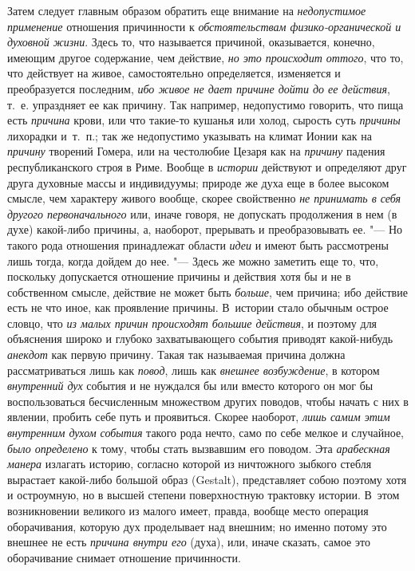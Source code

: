 Затем следует главным образом обратить еще внимание на
{\em недопустимое применение} отношения причинности к
{\em обстоятельствам физико-органической и духовной
жизни}. Здесь то, что называется причиной, оказывается, конечно, имеющим
другое содержание, чем действие, {\em но это происходит
оттого}, что то, что действует на живое, самостоятельно определяется,
изменяется и преобразуется последним, {\em ибо живое не
дает причине дойти до ее действия}, т.~е. упраздняет ее как причину. Так
например, недопустимо говорить, что пища есть
{\em причина} крови, или что такие-то кушанья или
холод, сырость суть {\em причины} лихорадки и~т.~п.;
так же недопустимо указывать на климат Ионии как на
{\em причину} творений Гомера, или на честолюбие Цезаря
как на {\em причину} падения республиканского строя в
Риме. Вообще в {\em истории} действуют и определяют
друг друга духовные массы и индивидуумы; природе же духа еще в более
высоком смысле, чем характеру живого вообще, скорее свойственно
{\em не принимать в себя другого первоначального} или,
иначе говоря, не допускать продолжения в нем (в духе) какой-либо причины,
а, наоборот, прерывать и преобразовывать ее. "--- Но такого рода отношения
принадлежат области {\em идеи} и имеют быть рассмотрены
лишь тогда, когда дойдем до нее. "--- Здесь же можно заметить еще то, что,
поскольку допускается отношение причины и действия хотя бы и не в
собственном смысле, действие не может быть
{\em больше}, чем причина; ибо действие есть не что
иное, как проявление причины. В~истории стало обычным острое словцо, что
{\em из малых причин происходят большие действия}, и
поэтому для объяснения широко и глубоко захватывающего события приводят
какой-нибудь {\em анекдот} как первую причину. Такая
так называемая причина должна рассматриваться лишь как
{\em повод}, лишь как {\em внешнее
возбуждение}, в котором {\em внутренний дух} события и
не нуждался бы или вместо которого он мог бы воспользоваться бесчисленным
множеством других поводов, чтобы начать с них в явлении, пробить себе путь
и проявиться. Скорее наоборот, {\em лишь самим этим
внутренним духом события} такого рода нечто, само по себе мелкое и
случайное, {\em было определено} к тому, чтобы стать
вызвавшим его поводом. Эта {\em арабескная манера}
излагать историю, согласно которой из ничтожного зыбкого стебля вырастает
какой-либо большой образ (Gestalt), представляет собою поэтому хотя и
остроумную, но в высшей степени поверхностную трактовку истории. В~этом
возникновении великого из малого имеет, правда, вообще место операция
оборачивания, которую дух проделывает над внешним; но именно потому это
внешнее не есть {\em причина внутри его} (духа), или,
иначе сказать, самое это оборачивание снимает отношение причинности.

